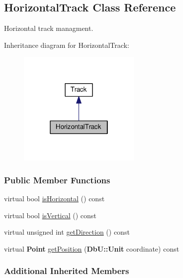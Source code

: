 \hypertarget{classKite_1_1HorizontalTrack}{\subsection{Horizontal\-Track Class Reference}
\label{classKite_1_1HorizontalTrack}
}


Horizontal track managment.  




Inheritance diagram for Horizontal\-Track\-:\nopagebreak
\begin{figure}[H]
\begin{center}
\leavevmode
\includegraphics[width=166pt]{classKite_1_1HorizontalTrack__inherit__graph}
\end{center}
\end{figure}
\subsubsection*{Public Member Functions}
\begin{DoxyCompactItemize}
\item 
virtual bool \hyperlink{classKite_1_1HorizontalTrack_ac46ac3b48d712750c7888b48964ac189}{is\-Horizontal} () const 
\item 
virtual bool \hyperlink{classKite_1_1HorizontalTrack_a2bb30e82aad1f321af4a065338775f36}{is\-Vertical} () const 
\item 
virtual unsigned int \hyperlink{classKite_1_1HorizontalTrack_a09d03fbca9ab891c2f25bdae7f89a899}{get\-Direction} () const 
\item 
virtual {\bf Point} \hyperlink{classKite_1_1HorizontalTrack_a87f1520092c5421a57aa2468d2814c09}{get\-Position} ({\bf Db\-U\-::\-Unit} coordinate) const 
\end{DoxyCompactItemize}
\subsubsection*{Additional Inherited Members}



